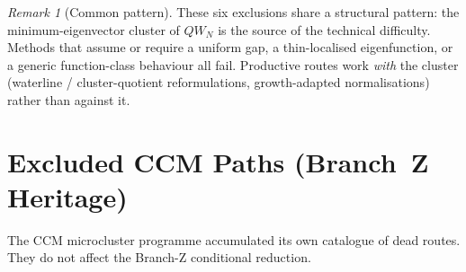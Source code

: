\documentclass[12pt,a4paper]{article}
\theoremstyle{definition}
\theoremstyle{remark}
\newtheorem{remark}[theorem]{Remark}
\begin{document}
\begin{remark}[Common pattern]
\label{rem:spectral-pattern}
These six exclusions share a structural pattern: the minimum-eigenvector
cluster of $QW_N$ is the source of the technical difficulty. Methods
that assume or require a uniform gap, a thin-localised eigenfunction, or
a generic function-class behaviour all fail. Productive routes work
\emph{with} the cluster (waterline / cluster-quotient reformulations,
growth-adapted normalisations) rather than against it.
\end{remark}


\section{Excluded CCM Paths (Branch~Z Heritage)}
\label{sec:excluded-ccm}

The CCM microcluster programme accumulated its own catalogue of dead
routes. They do not affect the Branch-Z conditional reduction.
\end{document}
